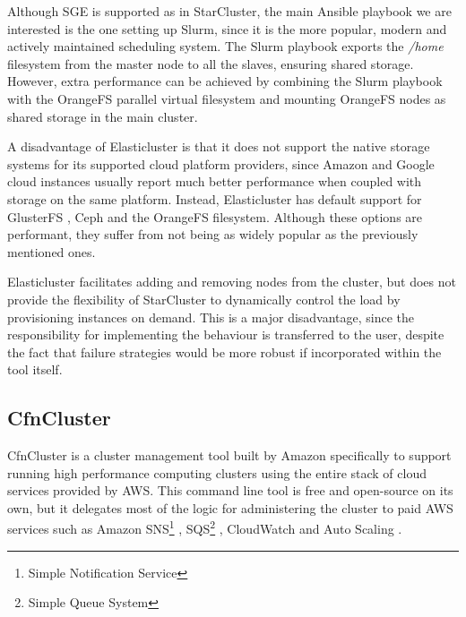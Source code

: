 Although SGE is supported as in StarCluster, the main Ansible playbook we are interested is the one setting up Slurm, since it is the more popular, modern and actively maintained scheduling system. The Slurm playbook exports the \textit{/home} filesystem from the master node to all the slaves, ensuring shared storage. However, extra performance can be achieved by combining the Slurm playbook with the OrangeFS parallel virtual filesystem and mounting OrangeFS nodes as shared storage in the main cluster.

A disadvantage of Elasticluster is that it does not support the native storage systems for its supported cloud platform providers, since Amazon and Google cloud instances usually report much better performance when coupled with storage on the same platform. Instead, Elasticluster has default support for GlusterFS \cite{GlusterFS}, Ceph \cite{Ceph} and the OrangeFS \cite{OrangeFS} filesystem. Although these options are performant, they suffer from not being as widely popular as the previously mentioned ones.

Elasticluster facilitates adding and removing nodes from the cluster, but does not provide the flexibility of StarCluster to dynamically control the load by provisioning instances on demand. This is a major disadvantage, since the responsibility for implementing the behaviour is transferred to the user, despite the fact that failure strategies would be more robust if incorporated within the tool itself.

\subsection{CfnCluster}

CfnCluster is a cluster management tool built by Amazon specifically to support running high performance computing  clusters using the entire stack of cloud services provided by AWS. This command line tool is free and open-source on its own, but it delegates most of the logic for administering the cluster to paid AWS services such as Amazon SNS\footnote{Simple Notification Service} \cite{SNS}, SQS\footnote{Simple Queue System} \cite{SQS}, CloudWatch \cite{CloudWatch} and Auto Scaling \cite{AutoScaling}.

